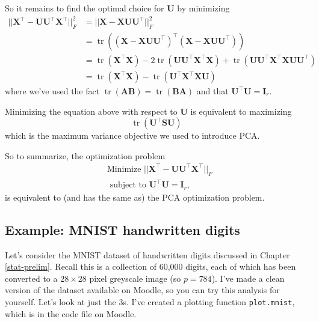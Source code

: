 \documentclass[
]{book}
\theoremstyle{definition}
\theoremstyle{definition}
\theoremstyle{definition}
\theoremstyle{definition}
\theoremstyle{remark}
\begin{document}
So it remains to find the optimal choice for \(\mathbf U\) by minimizing
\begin{align*}
||\mathbf X^\top - \mathbf U\mathbf U^\top \mathbf X^\top||_F^2 &=||\mathbf X- \mathbf X\mathbf U\mathbf U^\top ||_F^2\\
&= \operatorname{tr}((\mathbf X- \mathbf X\mathbf U\mathbf U^\top)^\top(\mathbf X- \mathbf X\mathbf U\mathbf U^\top))\\
&= \operatorname{tr}(\mathbf X^\top \mathbf X) - 2 \operatorname{tr}(\mathbf U\mathbf U^\top \mathbf X^\top\mathbf X) +  \operatorname{tr}(\mathbf U\mathbf U^\top \mathbf X^\top\mathbf X\mathbf U\mathbf U^\top)\\
&= \operatorname{tr}(\mathbf X^\top \mathbf X)  - \operatorname{tr}(\mathbf U^\top \mathbf X^\top \mathbf X\mathbf U) 
\end{align*}
where we've used the fact \(\operatorname{tr}(\mathbf A\mathbf B) = \operatorname{tr}(\mathbf B\mathbf A)\) and that \(\mathbf U^\top \mathbf U=\mathbf I_r\).

Minimizing the equation above with respect to \(\mathbf U\) is equivalent to maximizing
\[\operatorname{tr}(\mathbf U^\top \mathbf S\mathbf U) \]
which is the maximum variance objective we used to introduce PCA.

So to summarize, the optimization problem
\begin{align*}
&\mbox{Minimize } ||\mathbf X^\top -\mathbf U\mathbf U^\top \mathbf X^\top||_F \\
 &\mbox{ subject to } \mathbf U^\top \mathbf U=\mathbf I_r,
 \end{align*}
is equivalent to (and has the same as) the PCA optimization problem.

\subsection{Example: MNIST handwritten digits}\label{pca-mnist}

Let's consider the MNIST dataset of handwritten digits discussed in Chapter \ref{stat-prelim}. Recall this is a collection of 60,000 digits, each of which has been converted to a \(28\times 28\) pixel greyscale image (so \(p=784\)).
I've made a clean version of the dataset available on Moodle, so you can try this analysis for yourself. Let's look at just the 3s. I've created a plotting function \texttt{plot.mnist}, which is in the code file on Moodle.
\end{document}
